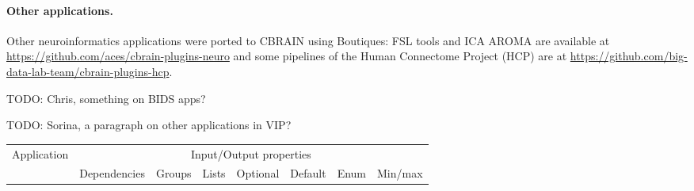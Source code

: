 \documentclass{article}
\newcommand{\todo}[1]{\color{red}TODO: #1\color{black}}
\begin{document}
\paragraph{Other applications.} Other neuroinformatics applications were ported to CBRAIN using Boutiques:
FSL tools and ICA AROMA are available at
\url{https://github.com/aces/cbrain-plugins-neuro} and some pipelines
of the Human Connectome Project (HCP) are at
\url{https://github.com/big-data-lab-team/cbrain-plugins-hcp}.


\todo{Chris, something on BIDS apps?}


\todo{Sorina, a paragraph on other applications in VIP?}

\begin{table}
  \begin{tabular}{l|ccccccc}
    \rowcolor[gray]{0.9}
    Application                      & \multicolumn{7}{c}{Input/Output properties} \\
    \rowcolor[gray]{0.9}
                                     & Dependencies      &Groups             & Lists             & Optional          &Default            & Enum              & Min/max\\
    

\end{tabular}
\end{table}
\end{document}
